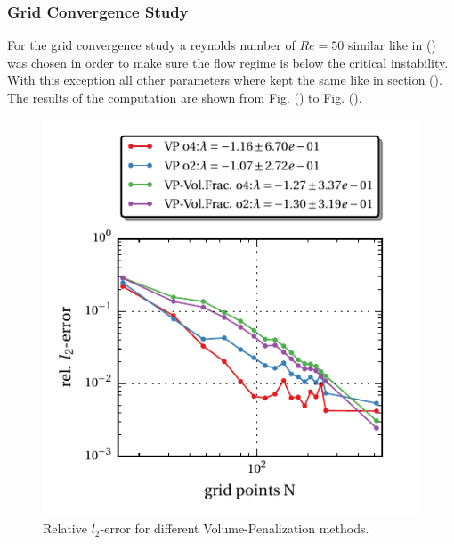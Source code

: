 \subsubsection{Grid Convergence Study}

For the grid convergence study a reynolds number of $Re=50$  similar like in () was chosen in order to make sure the flow regime
is below the critical instability. With this exception all other parameters where kept the same like in section ().
The results of the computation are shown from Fig. () to Fig. ().


\clearpage
\begin{figure}[!bp]
  \begin{minipage}[c]{0.5\textwidth}
      \includegraphics{gfx/immersed_boundary/tcflow/theo/vp.pdf}
      \caption{Relative $l_2$-error for different Volume-Penalization methods.}
  \end{minipage}
  \begin{minipage}[c]{0.5\textwidth}

\end{minipage}
\end{figure}
